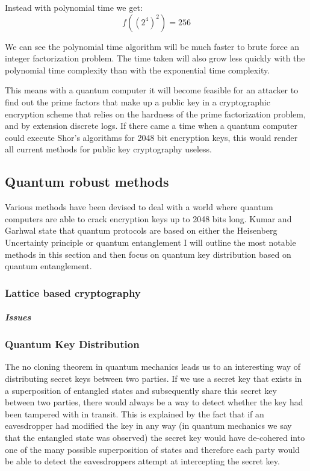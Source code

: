\documentclass{article}
\begin{document}
Instead with polynomial time we get:
\[f((2^4)^2) = 256\]

We can see the polynomial time algorithm will be much faster to brute force an integer factorization problem. The time taken will also grow less quickly with the polynomial time complexity than with the exponential time complexity.

This means with a quantum computer it will become feasible for an attacker to find out the prime factors that make up a public key in a cryptographic encryption scheme that relies on the hardness of the prime factorization problem, and by extension discrete logs. If there came a time when a quantum computer could execute Shor's algorithms for 2048 bit encryption keys, this would render all current methods for public key cryptography useless.

\subsection{Quantum robust methods}
Various methods have been devised to deal with a world where quantum computers are able to crack encryption keys up to 2048 bits long. Kumar and Garhwal state that quantum protocols are based on either the Heisenberg Uncertainty principle or quantum entanglement \cite{Kumar2021State-of-the-ArtCryptography} I will outline the most notable methods in this section and then focus on quantum key distribution based on quantum entanglement. 

\subsubsection{Lattice based cryptography}

\subparagraph{Issues}

\subsubsection{Quantum Key Distribution}
The no cloning theorem in quantum mechanics leads us to an interesting way of distributing secret keys between two parties. If we use a secret key that exists in a superposition of entangled states and subsequently share this secret key between two parties, there would always be a way to detect whether the key had been tampered with in transit. This is explained by the fact that if an eavesdropper had modified the key in any way (in quantum mechanics we say that the entangled state was observed) the secret key would have de-cohered into one of the many possible superposition of states and therefore each party would be able to detect the eavesdroppers attempt at intercepting the secret key. 
\end{document}
